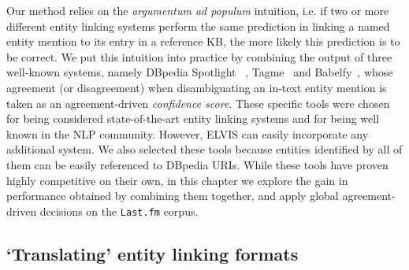 Our method relies on the \textit{argumentum ad populum} intuition, i.e. if two or more different entity linking systems perform the same prediction in linking a named entity mention to its entry in a reference KB, the more likely this prediction is to be correct. We put this intuition into practice by combining the output of three well-known systems, namely DBpedia Spotlight~\citep{Mendes2011} , Tagme~\citep{Ferragina2012} and Babelfy~\citep{Moroetal2014b}, whose agreement (or disagreement) when disambiguating an in-text entity mention is taken as an agreement-driven \textit{confidence score}. These specific tools were chosen for being considered state-of-the-art entity linking systems and for being well known in the NLP community. However, \textsc{ELVIS} can easily incorporate any additional system. We also selected these tools because entities identified by all of them can be easily referenced to DBpedia URIs. 
While these tools have proven highly competitive on their own, in this chapter we explore the gain in performance obtained by combining them together, and apply global agreement-driven decisions on the \texttt{Last.fm} corpus.


\subsection{`Translating' entity linking formats}
\label{sec:linking:unification}

